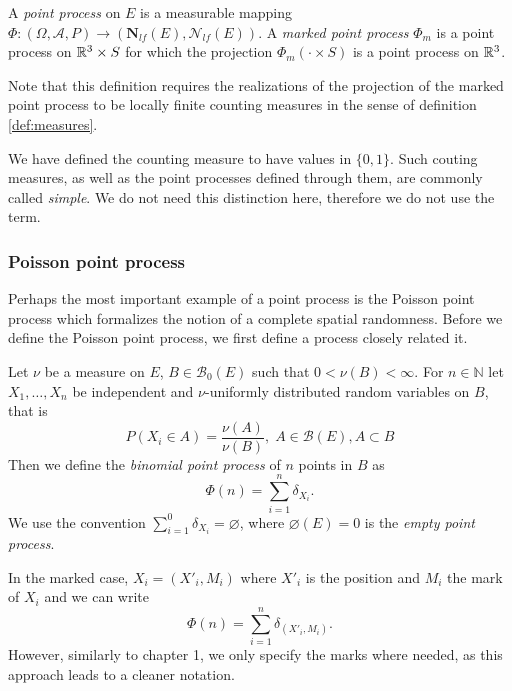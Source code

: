 \begin{definition}
A \textit{point process} on $E$ is a measurable mapping $\Phi:(\Omega,\mathcal A, P) \to (\mathbf N_{lf}(E),\mathcal N_{lf}(E))$. \newline
A \textit{marked point process} $\Phi_m$ is a point process on ${\mathbb R^3}\times S$ for which the projection $\Phi_m(\cdot \times S)$ is a point process on ${\mathbb R^3}$.
\end{definition}
Note that this definition requires the realizations of the projection of the marked point process to be locally finite counting measures in the sense of definition \ref{def:measures}.

\begin{remark}
	We have defined the counting measure to have values in $\{0,1\}$. Such couting measures, as well as the point processes defined through them, are commonly called \textit{simple}. We do not need this distinction here, therefore we do not use the term.
\end{remark}


\subsubsection{Poisson point process}
Perhaps the most important example of a point process is the Poisson point process which formalizes the notion of a complete spatial randomness. Before we define the Poisson point process, we first define a process closely related it.

\begin{definition} Let $\nu$ be a measure on $E$, $B \in \mathcal B_0(E)$ such that $0<\nu(B)<\infty$. For $n\in \mathbb N$ let $X_1,\dots,X_n$ be independent and $\nu$-uniformly distributed random variables on $B$, that is
	$$P(X_i \in A) = \frac{\nu(A)}{\nu(B)},\; A\in\mathcal B(E), A \subset B$$
Then we define the \textit{binomial point process} of $n$ points in $B$ as
$$\Phi(n) = \sum^{n}_{i=1}  \delta_{X_i}.$$
We use the convention $\sum^0_{i=1} \delta_{X_i} = \varnothing$, where $\varnothing(E)=0$ is the \textit{empty point process}.
\end{definition}
In the marked case, $X_i=(X'_i,M_i)$ where $X'_i$ is the position and $M_i$ the mark of $X_i$ and we can write
$$\Phi(n) = \sum^{n}_{i=1} \delta_{(X'_i,M_i)}.$$
However, similarly to chapter 1, we only specify the marks where needed, as this approach leads to a cleaner notation. 

